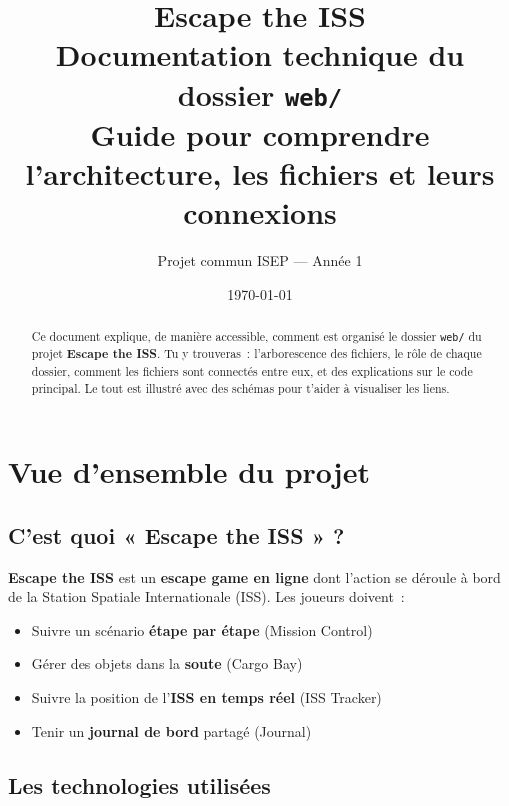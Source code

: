 \documentclass[12pt,a4paper]{article}
\title{
    \vspace{-1cm}
    {\Huge\textcolor{cyanaccent}{\textbf{Escape the ISS}}}\\[0.3cm]
    {\Large Documentation technique du dossier \texttt{web/}}\\[0.2cm]
    {\normalsize Guide pour comprendre l'architecture, les fichiers et leurs connexions}
}
\author{Projet commun ISEP --- Année 1}
\date{\today}
\begin{document}
\maketitle
\thispagestyle{fancy}

\begin{abstract}
Ce document explique, de manière accessible, comment est organisé le dossier \texttt{web/} du projet \textbf{Escape the ISS}. Tu y trouveras~: l'arborescence des fichiers, le rôle de chaque dossier, comment les fichiers sont connectés entre eux, et des explications sur le code principal. Le tout est illustré avec des schémas pour t'aider à visualiser les liens.
\end{abstract}

\tableofcontents
\newpage

\section{Vue d'ensemble du projet}

\subsection{C'est quoi « Escape the ISS » ?}

\textbf{Escape the ISS} est un \textbf{escape game en ligne} dont l'action se déroule à bord de la Station Spatiale Internationale (ISS). Les joueurs doivent~:
\begin{itemize}[leftmargin=2cm]
    \item[\faRocket] Suivre un scénario \textbf{étape par étape} (Mission Control)
    \item[\faBox] Gérer des objets dans la \textbf{soute} (Cargo Bay)
    \item[\faGlobeEurope] Suivre la position de l'\textbf{ISS en temps réel} (ISS Tracker)
    \item[\faPen] Tenir un \textbf{journal de bord} partagé (Journal)
\end{itemize}

\subsection{Les technologies utilisées}
\end{document}

